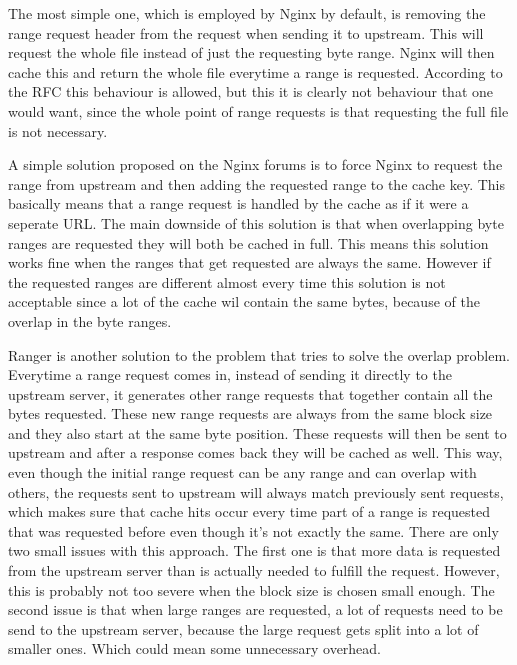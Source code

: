 \documentclass[twoside,openright]{uva-bachelor-thesis}
\begin{document}
The most simple one, which is employed by Nginx by default,
is removing the range request header from the request when sending it to
upstream. This will request the whole file instead of just the requesting byte
range. Nginx will then cache this and return the whole file everytime a range is
requested. According to the RFC this behaviour is allowed, but this it is
clearly not behaviour that one would want, since the whole point of range
requests is that requesting the full file is not necessary.

A simple solution proposed on the Nginx forums\autocite{nginxcacheforum} is to
force Nginx to request the range from upstream and then adding the requested
range to the cache key. This basically means that a range request is handled by
the cache as if it were a seperate URL\@. The main downside of this solution is that
when overlapping byte ranges are requested they will both be cached in full.
This means this  solution works fine when the ranges that get requested are
always the same. However if the requested ranges are different almost every
time this solution is not acceptable since a lot of the cache wil contain the
same bytes, because of the overlap in the byte ranges.


Ranger\autocite{ranger} is another solution to the problem that tries to solve
the overlap problem. Everytime a range request comes in, instead of sending it
directly to the upstream server, it generates other range requests that together
contain all the bytes requested. These new range requests are always from the
same block size and they also start at the same byte position. These requests
will then be sent to upstream and after a response comes back they will be
cached as well.  This way, even though the initial range request can be any
range and can overlap with others, the requests sent to upstream will always
match previously sent requests, which makes sure that cache hits occur every
time part of a range is requested that was requested before even though it's not
exactly the same. There are only two small issues with this approach. The first
one is that more data is requested from the upstream server than is actually
needed to fulfill the request. However, this is probably not too severe when the
block size is chosen small enough. The second issue is that when large ranges
are requested, a lot of requests need to be send to the upstream server, because
the large request gets split into a lot of smaller ones. Which could mean some
unnecessary overhead.
\end{document}
